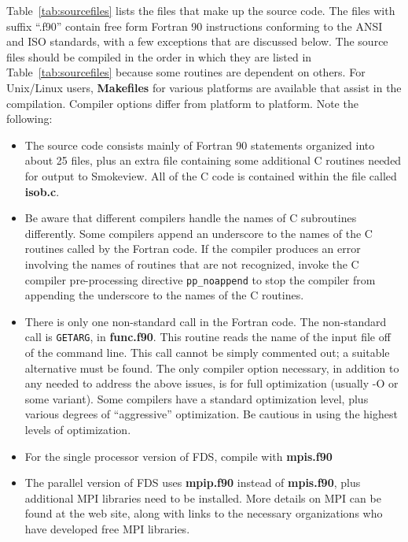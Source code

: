 \documentclass[11pt]{book}
\newcommand{\ct}{\tt\small}
\begin{document}
Table~\ref{tab:sourcefiles} lists the files that make up the source code.
The files with suffix ``.f90'' contain free form Fortran 90 instructions
conforming to the ANSI and ISO standards, with a few exceptions that are discussed below.
The source files should be compiled in the order in which they are listed
in Table~\ref{tab:sourcefiles} because some routines are dependent on others.
For Unix/Linux users, {\bf Makefiles} for various platforms are available
that assist in the compilation. Compiler options differ from platform to platform.
Note the following:
\begin{itemize}
\item The source code consists mainly of Fortran 90
statements organized into about 25 files, plus an extra file containing
some additional C routines needed for output to Smokeview.
All of the C code is contained within the file called {\bf isob.c}.
\item Be aware that different
compilers handle the names of C subroutines differently. Some compilers
append an underscore to the names of the C routines called by the Fortran
code. If the compiler produces an error involving the names of routines
that are not recognized, invoke the C compiler pre-processing directive {\ct pp\_noappend} to stop
the compiler from appending the underscore to the names of the C routines.
\item There is only one non-standard call in the Fortran code. The non-standard call is {\ct GETARG},
in {\bf func.f90}. This routine reads the name of the input file off of the command line. This call cannot
be simply commented out; a suitable alternative must be found.
The only compiler option necessary, in addition to any needed to
address the above issues, is for full optimization (usually -O or some variant). Some
compilers have a standard optimization level, plus various degrees of
``aggressive'' optimization. Be cautious in using the highest levels of optimization.
\item For the single processor version of FDS, compile with {\bf mpis.f90}
\item The parallel version of FDS uses {\bf mpip.f90} instead of
{\bf mpis.f90}, plus additional MPI libraries need to be installed. More
details on MPI can be found at the web site, along with links to the
necessary organizations who have developed free MPI libraries.
\end{itemize}
\end{document}
